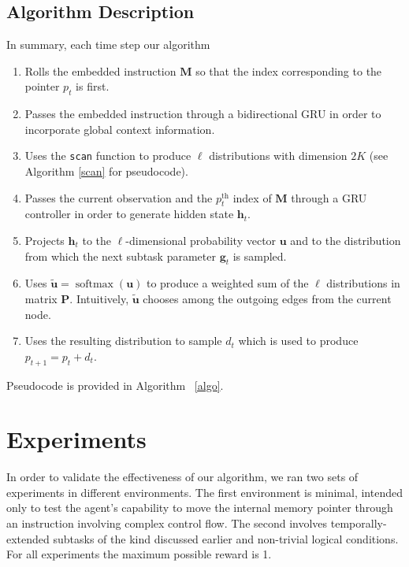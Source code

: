 \documentclass{article}
\DeclareMathOperator{\softmax}{softmax}
\begin{document}
\subsection{Algorithm Description}
In summary, each time step our algorithm 
\begin{enumerate}
  \item Rolls the embedded instruction $\mathbf{M}$ so that the index
    corresponding to the pointer $p_t$ is first.
  \item Passes the embedded instruction through a bidirectional GRU in order to
    incorporate global context information.
  \item Uses the \texttt{scan} function to produce $\ell$ distributions with
    dimension $2K$ (see Algorithm \ref{scan} for pseudocode).
  \item Passes the current observation and the $p_t^{\text{th}}$ index of
    $\mathbf{M}$ through a GRU controller in order to generate hidden state
    $\mathbf{h}_t$.
  \item Projects $\mathbf{h}_t$ to the  $\ell$-dimensional probability vector
    $\mathbf{u}$ and to the distribution from which the next subtask parameter
    $\mathbf{g}_t$ is sampled.
  \item Uses $\tilde{\mathbf{u}} = \softmax(\mathbf{u})$ to produce a weighted
    sum of the $\ell$ distributions in matrix $\mathbf{P}$. Intuitively,
    $\tilde{\mathbf{u}}$ chooses among the outgoing edges from the current node.
  \item Uses the resulting distribution to sample $d_t$ which is used to produce
    $p_{t+1} = p_t + d_t$.
\end{enumerate}
Pseudocode is provided in Algorithm ~\ref{algo}.

\section{Experiments}
\label{experiments}
In order to validate the effectiveness of our algorithm, we ran two sets of
experiments in different environments. The first environment is minimal,
intended only to test
the agent's capability to move the internal memory pointer through an instruction
involving complex control flow. The second involves temporally-extended subtasks
of the kind discussed earlier and non-trivial logical conditions. For all
experiments the maximum possible reward is 1.
\end{document}
